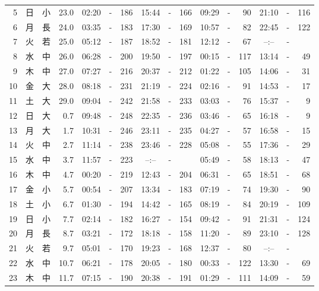 \documentclass[12pt.a4j]{jsarticle}
\begin{document}
\begin{center}
\begin{table}[ht]
\begin{tabular}{|rc|cr|ccrccr|ccrccr|}
 5 & 日 & 小 & 23.0 &  02:20 &-& 186  &  15:44 &-& 166  &   09:29 &-&  90  &   21:10 &-& 116  \\
 6 & 月 & 長 & 24.0 &  03:35 &-& 183  &  17:30 &-& 169  &   10:57 &-&  82  &   22:45 &-& 122  \\
 7 & 火 & 若 & 25.0 &  05:12 &-& 187  &  18:52 &-& 181  &   12:12 &-&  67  &   --:-- &-&     \\
 8 & 水 & 中 & 26.0 &  06:28 &-& 200  &  19:50 &-& 197  &   00:15 &-& 117  &   13:14 &-&  49  \\
 9 & 木 & 中 & 27.0 &  07:27 &-& 216  &  20:37 &-& 212  &   01:22 &-& 105  &   14:06 &-&  31  \\
10 & 金 & 大 & 28.0 &  08:18 &-& 231  &  21:19 &-& 224  &   02:16 &-&  91  &   14:53 &-&  17  \\
11 & 土 & 大 & 29.0 &  09:04 &-& 242  &  21:58 &-& 233  &   03:03 &-&  76  &   15:37 &-&   9  \\
12 & 日 & 大 &  0.7 &  09:48 &-& 248  &  22:35 &-& 236  &   03:46 &-&  65  &   16:18 &-&   9  \\
13 & 月 & 大 &  1.7 &  10:31 &-& 246  &  23:11 &-& 235  &   04:27 &-&  57  &   16:58 &-&  15  \\
14 & 火 & 中 &  2.7 &  11:14 &-& 238  &  23:46 &-& 228  &   05:08 &-&  55  &   17:36 &-&  29  \\
15 & 水 & 中 &  3.7 &  11:57 &-& 223  &  --:-- &-&     &   05:49 &-&  58  &   18:13 &-&  47  \\
16 & 木 & 中 &  4.7 &  00:20 &-& 219  &  12:43 &-& 204  &   06:31 &-&  65  &   18:51 &-&  68  \\
17 & 金 & 小 &  5.7 &  00:54 &-& 207  &  13:34 &-& 183  &   07:19 &-&  74  &   19:30 &-&  90  \\
18 & 土 & 小 &  6.7 &  01:30 &-& 194  &  14:42 &-& 165  &   08:19 &-&  84  &   20:19 &-& 109  \\
19 & 日 & 小 &  7.7 &  02:14 &-& 182  &  16:27 &-& 154  &   09:42 &-&  91  &   21:31 &-& 124  \\
20 & 月 & 長 &  8.7 &  03:21 &-& 172  &  18:18 &-& 158  &   11:20 &-&  89  &   23:10 &-& 128  \\
21 & 火 & 若 &  9.7 &  05:01 &-& 170  &  19:23 &-& 168  &   12:37 &-&  80  &   --:-- &-&     \\
22 & 水 & 中 & 10.7 &  06:21 &-& 178  &  20:05 &-& 180  &   00:33 &-& 122  &   13:30 &-&  69  \\
23 & 木 & 中 & 11.7 &  07:15 &-& 190  &  20:38 &-& 191  &   01:29 &-& 111  &   14:09 &-&  59  \\

\end{tabular}
\end{table}
\end{center}
\end{document}

